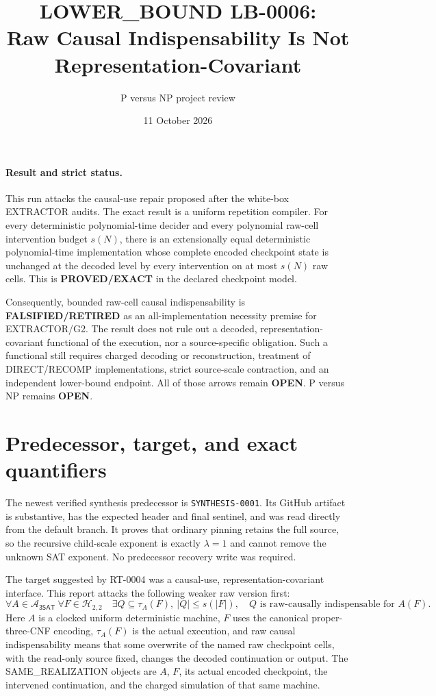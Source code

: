 \documentclass[11pt]{article}
\title{LOWER\_BOUND LB-0006:\\
Raw Causal Indispensability Is Not Representation-Covariant}
\author{P versus NP project review}
\date{11 October 2026}
\newcommand{\SAT}{\mathsf{3SAT}}
\begin{document}
\maketitle

\paragraph{Result and strict status.}
This run attacks the causal-use repair proposed after the white-box
EXTRACTOR audits.  The exact result is a uniform repetition compiler.  For
every deterministic polynomial-time decider and every polynomial raw-cell
intervention budget $s(N)$, there is an extensionally equal deterministic
polynomial-time implementation whose complete encoded checkpoint state is
unchanged at the decoded level by every intervention on at most $s(N)$ raw
cells.  This is \textbf{PROVED/EXACT} in the declared checkpoint model.

Consequently, bounded raw-cell causal indispensability is
\textbf{FALSIFIED/RETIRED} as an all-implementation necessity premise for
EXTRACTOR/G2.  The result does not rule out a decoded, representation-covariant
functional of the execution, nor a source-specific obligation.  Such a
functional still requires charged decoding or reconstruction, treatment of
DIRECT/RECOMP implementations, strict source-scale contraction, and an
independent lower-bound endpoint.  All of those arrows remain \textbf{OPEN}.
P versus NP remains \textbf{OPEN}.

\section{Predecessor, target, and exact quantifiers}
The newest verified synthesis predecessor is
\texttt{SYNTHESIS-0001}.  Its GitHub artifact is substantive, has the expected
header and final sentinel, and was read directly from the default branch.
It proves that ordinary pinning retains the full source, so the recursive
child-scale exponent is exactly $\lambda=1$ and cannot remove the unknown SAT
exponent.  No predecessor recovery write was required.

The target suggested by RT-0004 was a causal-use, representation-covariant
interface.  This report attacks the following weaker raw version first:
\[
 \forall A\in\mathcal A_{\SAT}\ \forall F\in\mathcal H_{2,2}\quad
 \exists Q\subseteq\tau_A(F),\ |Q|\le s(|F|),
 \quad Q\text{ is raw-causally indispensable for }A(F).
 \tag{1}
\]
Here $A$ is a clocked uniform deterministic machine, $F$ uses the canonical
proper-three-CNF encoding, $\tau_A(F)$ is the actual execution, and raw causal
indispensability means that some overwrite of the named raw checkpoint cells,
with the read-only source fixed, changes the decoded continuation or output.
The SAME\_REALIZATION objects are $A$, $F$, its actual encoded checkpoint, the
intervened continuation, and the charged simulation of that same machine.
\end{document}
